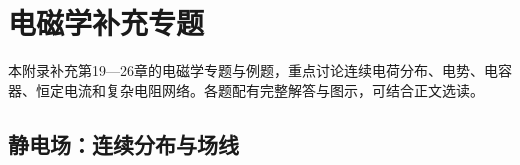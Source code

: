 \begingroup{}
\chapter{电磁学补充专题}



本附录补充第19—26章的电磁学专题与例题，重点讨论连续电荷分布、电势、电容器、恒定电流和复杂电阻网络。各题配有完整解答与图示，可结合正文选读。


\section{静电场：连续分布与场线}

\begingroup

\graphicspath{{../../../sample/xes-original/eighteenth-section/}{../../../sample/xes-original/eighteenth-section/assets/}}


